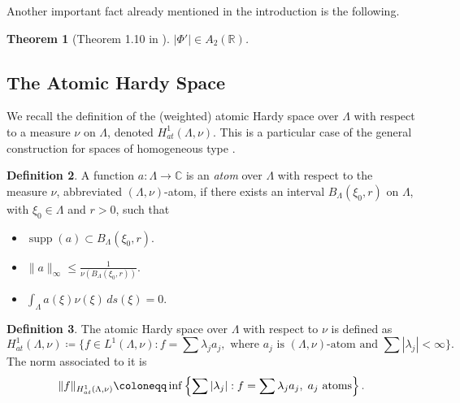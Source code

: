 \documentclass[12pt]{amsart}
\newcommand{\R}{\mathbb{R}}
\newcommand{\C}{\mathbb{C}}
\newcommand{\supp}[1]{\operatorname{supp}\left(#1\right) }
\theoremstyle{plain}
\newtheorem{theorem}{Theorem}[section]
\theoremstyle{definition}
\newtheorem{definition}[theorem]{Definition}
\numberwithin{equation}{section}
\begin{document}
Another important fact already mentioned  in the introduction is the following.

\begin{theorem}[Theorem 1.10 in \cite{kenigWeighted}]
    $|\Phi'|\in A_2(\R)$.
\end{theorem}



\subsection{The Atomic Hardy Space}

We recall the definition of the (weighted) atomic Hardy space over $\Lambda$ with respect to a measure $\nu$ on $\Lambda$, denoted $H_{at}^{1}(\Lambda,\nu)$. This is a particular case of the general construction for spaces of homogeneous type \cite{coifmanWeiss}. 





\begin{definition}\label{def:dsLambdaAtom}
    A function $a\colon\Lambda\to \C$ is an \textit{atom} over $\Lambda$ with respect to the measure $\nu$, abbreviated $(\Lambda,\nu)$-atom, if there exists an interval $B_{\Lambda}(\xi_0,r)$ on $\Lambda$,  with $\xi_0\in\Lambda$ and $r>0$, such that
    \begin{itemize}
        \item $\supp{a}\subset B_{\Lambda}(\xi_0,r)$.
        \item $\|a\|_{\infty}\leq \frac{1}{\nu(B_{\Lambda}(\xi_0,r))}$.
        \item $\int_{\Lambda}a(\xi) \nu(\xi)\, ds(\xi)=0$.
    \end{itemize}
\end{definition}



\begin{definition}
    The atomic Hardy space over $\Lambda$ with respect to $\nu$ is defined as
    \[
    H_{at}^1(\Lambda,\nu)
    \coloneqq 
    \{f\in L^1(\Lambda,\nu): f=\sum \lambda_j a_j, \text{ where } a_j \text{ is } (\Lambda,\nu)\text{-atom and }\sum|\lambda_j|<\infty\}.
    \]
    The norm associated to it is
    \[
    \|f\|_{H_{at}^1(\Lambda,\nu)}
    \coloneqq 
    \inf\left\{\sum|\lambda_j|: f=\sum \lambda_j a_j,\hspace{0.1cm} a_j\text{ atoms}\right\}.
    \]
\end{definition}
\end{document}
